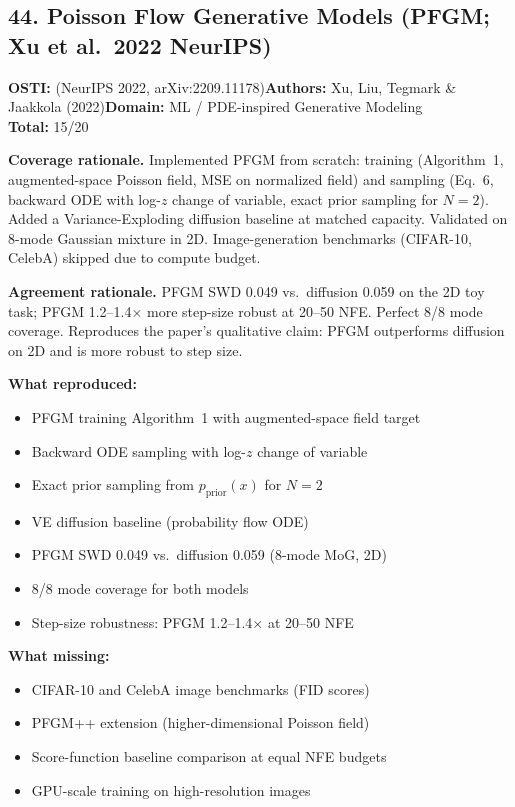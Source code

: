 \subsection{44. Poisson Flow Generative Models (PFGM; Xu et al.\ 2022 NeurIPS)}
\textbf{OSTI:} (NeurIPS 2022, arXiv:2209.11178)\quad\textbf{Authors:} Xu, Liu, Tegmark \& Jaakkola (2022)\quad\textbf{Domain:} ML / PDE-inspired Generative Modeling\\
\quad{}\quad\textbf{Total:} 15/20\par\smallskip
\noindent\textbf{Coverage rationale.} Implemented PFGM from scratch: training (Algorithm~1, augmented-space Poisson field, MSE on normalized field) and sampling (Eq.~6, backward ODE with log-$z$ change of variable, exact prior sampling for $N=2$). Added a Variance-Exploding diffusion baseline at matched capacity. Validated on 8-mode Gaussian mixture in 2D. Image-generation benchmarks (CIFAR-10, CelebA) skipped due to compute budget.\par
\noindent\textbf{Agreement rationale.} PFGM SWD 0.049 vs.\ diffusion 0.059 on the 2D toy task; PFGM 1.2--1.4$\times$ more step-size robust at 20--50 NFE. Perfect 8/8 mode coverage. Reproduces the paper's qualitative claim: PFGM outperforms diffusion on 2D and is more robust to step size.\par\smallskip
\noindent\textbf{What reproduced:}
\begin{itemize}[leftmargin=1.4em,itemsep=0.2em,topsep=0.2em]
\item PFGM training Algorithm~1 with augmented-space field target
\item Backward ODE sampling with log-$z$ change of variable
\item Exact prior sampling from $p_\mathrm{prior}(x)$ for $N=2$
\item VE diffusion baseline (probability flow ODE)
\item PFGM SWD 0.049 vs.\ diffusion 0.059 (8-mode MoG, 2D)
\item 8/8 mode coverage for both models
\item Step-size robustness: PFGM 1.2--1.4$\times$ at 20--50 NFE
\end{itemize}
\noindent\textbf{What missing:}
\begin{itemize}[leftmargin=1.4em,itemsep=0.2em,topsep=0.2em]
\item CIFAR-10 and CelebA image benchmarks (FID scores)
\item PFGM++ extension (higher-dimensional Poisson field)
\item Score-function baseline comparison at equal NFE budgets
\item GPU-scale training on high-resolution images
\end{itemize}
